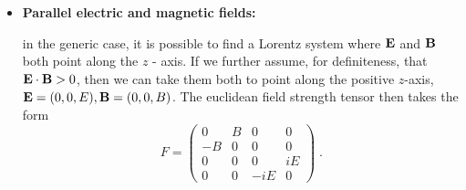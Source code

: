 \documentclass[a4paper,11pt]{article}
\begin{document}
\begin{itemize}

\item
{\bf Parallel electric and magnetic fields:} 

\noindent
in the generic case, it is possible to find a Lorentz system where 
$\bf E$ and $\bf B$ both point along the $z$ - axis.
If we further assume, for definiteness, that ${\bf E}\cdot{\bf B} > 0$, then we can 
take them both to point along the positive $z$-axis, 
${\bf E} = (0,0,E), {\bf B} = (0,0,B)$.
The euclidean field strength tensor then takes the form
%
\begin{equation}
F =
\left(
\begin{array}{*{4}{c}}
0&B&0&0\\
-B&0&0&0\\
0&0&0&iE\\
0&0&-iE&0
\end{array}
\right) \;.
\label{app-gd-Fspecial}
\end{equation}
\vspace{10pt}


\end{itemize}
\end{document}
